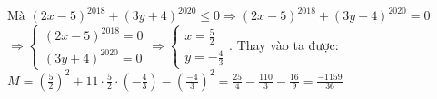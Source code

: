 \begin{bt}
{\begin{enumerate}
        $\text{Mà } (2 x-5)^{2018}+(3 y+4)^{2020} \leq 0 \Rightarrow(2 x-5)^{2018}+(3 y+4)^{2020}=0$\\[5px]
        $\Rightarrow\left\{\begin{array}{l}(2 x-5)^{2018}=0 \\[5px] (3 y+4)^{2020}=0\end{array} \Rightarrow\left\{\begin{array}{l}x=\frac{5}{2} \\[5px] y=-\frac{4}{3}\end{array}\right.\right.$. Thay vào ta được:\\[5px]
        $M=\left(\frac{5}{2}\right)^2+11 \cdot \frac{5}{2} \cdot\left(-\frac{4}{3}\right)-\left(\frac{-4}{3}\right)^2=\frac{25}{4}-\frac{110}{3}-\frac{16}{9}=\frac{-1159}{36}$
    \end{enumerate}
}
\end{bt}

